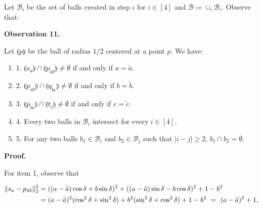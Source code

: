 Let $\mathcal{B}_{i}$ be the set of balls created in step $i$ for $i\in[4]$ and $\mathcal{B}\coloneqq\cup_{i}\mathcal{B}_{i}$. Observe that:
\par
\par
\par\medskip\noindent\textbf{Observation 11.}\par
Let $\llparenthesis p\rrparenthesis$ be the ball of radius $1/2$ centered at a point $p$. We have:
\par
\begin{enumerate}
\item[]  1. 
$\llparenthesis s_{a}\rrparenthesis\cap\llparenthesis p_{\tilde{a}b}%
\rrparenthesis\not=\emptyset$ if and only if $a=\tilde{a}$.
\par
\par
\item[]  2. 
$\llparenthesis p_{ab}\rrparenthesis\cap\llparenthesis q_{\tilde{b}c}%
\rrparenthesis\not=\emptyset$ if and only if $b=\tilde{b}$.
\par
\par
\item[]  3. 
$\llparenthesis p_{bc}\rrparenthesis\cap\llparenthesis t_{\tilde{c}}%
\rrparenthesis\not=\emptyset$ if and only if $c=\tilde{c}$.
\par
\par
\item[]  4. 
Every two balls in $\mathcal{B}_{i}$ intersect for every $i\in[4]$.
\par
\par
\item[]  5. 
For any two balls $b_{1}\in\mathcal{B}_{i}$ and $b_{2}\in\mathcal{B}_{j}$ such that $|i-j|\geq 2$, $b_{1}\cap b_{2}=\emptyset$.
\par
\par
\end{enumerate}
\par
\par
\par\medskip\noindent\textbf{Proof.}\par
For item 1, observe that
\par
\[\begin{aligned}
\begin{split}\|s_{a}-p_{\tilde{a}b}\|^{2}_{2}&=((a-\tilde{a})\cos\delta+b\sin%
\delta)^{2}+((a-\tilde{a})\sin\delta-b\cos\delta)^{2}+1-b^{2}\\
&=(a-\tilde{a})^{2}(\cos^{2}\delta+\sin^{2}\delta)+b^{2}(\sin^{2}\delta+\cos^{%
2}\delta)+1-b^{2}\nobreak\ =\nobreak\ (a-\tilde{a})^{2}+1,\end{split}
\end{aligned}\]
